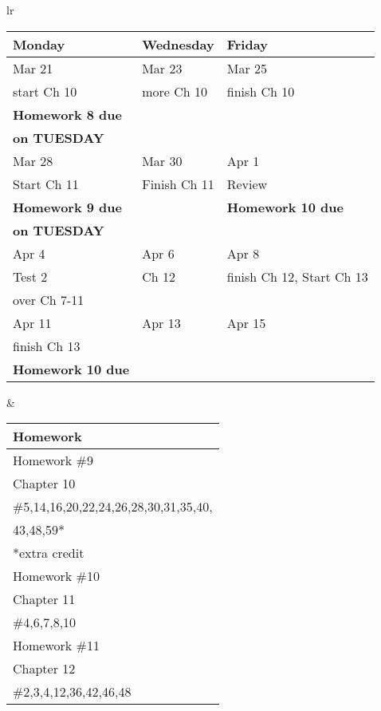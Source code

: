 \documentclass[11pt]{article}
\begin{document}
\newpage
\begin{tabular}{lr}
\begin{tabular}{|l|l|l|}
\hline
Monday & Wednesday & Friday \\
\hline \hline
Mar 21&Mar 23 & Mar 25\\
start Ch 10&more Ch 10&finish Ch 10\\
\textbf{Homework 8 due}&&\\
\textbf{on TUESDAY}&&\\
\hline
Mar 28 & Mar 30 & Apr 1 \\
Start Ch 11 &Finish Ch 11&Review\\
\textbf{Homework 9 due}&&\textbf{Homework 10 due}\\
\textbf{on TUESDAY}&&\\
\hline
Apr 4 & Apr 6 & Apr 8 \\
Test 2 & Ch 12 & finish Ch 12, Start Ch 13 \\
over Ch 7-11 &&\\
\hline
Apr 11& Apr 13 & Apr 15 \\
finish Ch 13&&\\
\textbf{Homework 10 due} &&\\
\hline
\end{tabular}
&
\begin{tabular}{|p{6cm}|}
\hline
Homework \\
\hline \hline
Homework \#9\\
Chapter 10\\
\#5,14,16,20,22,24,26,28,30,31,35,40,\\
43,48,59*\\
*extra credit \\
\hline
Homework \#10\\
Chapter 11\\
\#4,6,7,8,10\\
\hline
Homework \#11\\
Chapter 12\\
\#2,3,4,12,36,42,46,48\\
\hline
\end{tabular}
\end{tabular}
\end{document}
